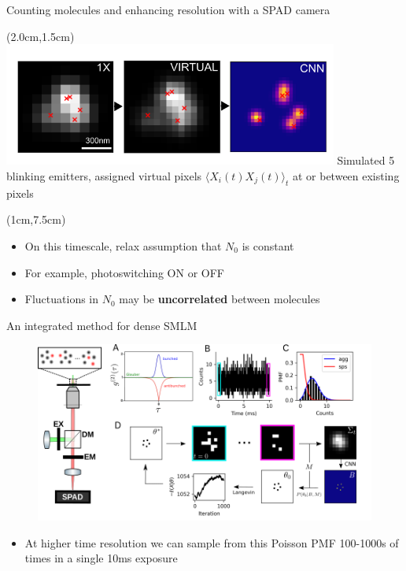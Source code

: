 \documentclass{beamer}					%
\begin{document}
\begin{frame}{Counting molecules and enhancing resolution with a SPAD camera}

\begin{textblock*}{11cm}(2.0cm,1.5cm)
\includegraphics[width=11cm]{Doubled-cNN.png}
Simulated 5 blinking emitters, assigned virtual pixels $\langle X_{i}(t)X_{j}(t) \rangle_{t}$ at or between existing pixels
\end{textblock*}

\begin{textblock*}{11cm}(1cm,7.5cm)
\begin{itemize}
\item On this timescale, relax assumption that $N_{0}$ is constant 
\item For example, photoswitching \textrm{ON} or \textrm{OFF}
\item Fluctuations in $N_{0}$ may be \textbf{uncorrelated} between molecules
\end{itemize}

\end{textblock*}

\end{frame}

\begin{frame}{An integrated method for dense SMLM}
\begin{figure}
\includegraphics[width=\textwidth]{SPAD.png}
\end{figure}
\begin{itemize}
\item At higher time resolution we can sample from this Poisson PMF 100-1000s of times in a single 10ms exposure
\end{itemize}
\end{frame}
\end{document}
